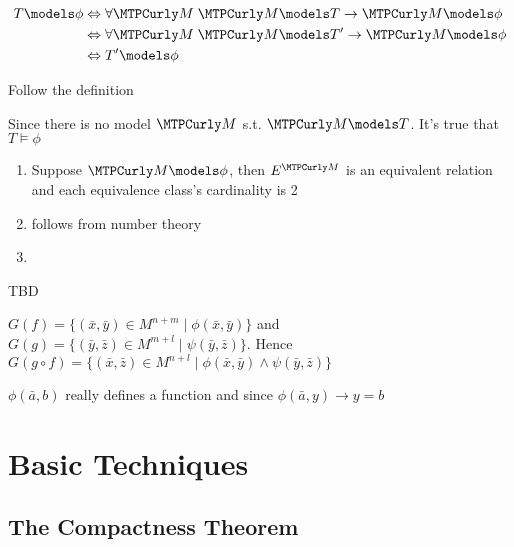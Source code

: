 \documentclass[11pt]{article}
\begin{document}
\begin{exercise}
\begin{align*}
T\models\phi&\Leftrightarrow\forall \calm\;\calm\models T\to\calm\models\phi\\
&\Leftrightarrow\forall \calm\;\calm\models T'\to\calm\models\phi\\
&\Leftrightarrow T'\models\phi
\end{align*}
\end{exercise}
\begin{exercise}
Follow the definition
\end{exercise}

\begin{exercise}
Since there is no model \(\calm\) s.t. \(\calm\models T\). It's true that 
\(T\models \phi\)
\end{exercise}

\begin{exercise}
\begin{enumerate}
\item Suppose \(\calm\models\phi\), then \(E^\calm\) is an equivalent relation and
each equivalence class's cardinality is 2
\item follows from number theory
\item \cite{DBLP:journals/bsl/DurandJMM12}
\end{enumerate}
\end{exercise}

\begin{exercise}
TBD
\end{exercise}

\begin{exercise}
\(G(f)=\{(\bar{x},\bar{y})\in M^{n+m}\mid\phi(\bar{x},\bar{y})\}\) and 
\(G(g)=\{(\bar{y},\bar{z})\in M^{m+l}\mid\psi(\bar{y},\bar{z})\}\). Hence
\(G(g\circ f)=\{(\bar{x},\bar{z})\in M^{n+l}\mid \phi(\bar{x},\bar{y})
   \wedge \psi(\bar{y},\bar{z})\}\)
\end{exercise}

\begin{exercise}
\(\phi(\bar{a},b)\) really defines a function and since 
\(\phi(\bar{a},y)\to y=b\)
\end{exercise}

\section{Basic Techniques}
\label{sec:org14a2765}
\subsection{The Compactness Theorem}
\label{sec:orgac964f0}
\end{document}
